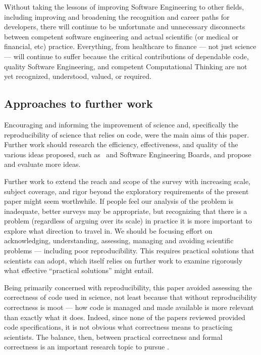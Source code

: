 \documentclass{comjnl}
\begin{document}
Without taking the lessons of improving Software Engineering to other fields, including improving and broadening the recognition and career paths for developers, there will continue to be unfortunate and unnecessary disconnects between competent software engineering and actual scientific (or medical or financial, etc) practice. Everything, from healthcare to finance --- not just science --- will continue to suffer because the critical contributions of dependable code, quality Software Engineering, and competent Computational Thinking are not yet recognized, understood, valued, or required. 

\subsection{Approaches to further work}
Encouraging and informing the improvement of science and, specifically the reproducibility of science that relies on code, were the main aims of this paper. Further work should research the efficiency, effectiveness, and quality of the various ideas proposed, such as \RAPstar\ and Software Engineering Boards, and propose and evaluate more ideas.

Further work to extend the reach and scope of the survey with increasing scale, subject coverage, and rigor beyond the exploratory requirements of the present paper might seem worthwhile. If people feel our analysis of the problem is inadequate, better surveys may be appropriate, but recognizing that there is a problem (regardless of arguing over its scale) in practice it is more important to explore what direction to travel in. We should be focusing effort on acknowledging, understanding, assessing, managing and avoiding scientific problems --- including poor reproducibility. This requires practical solutions that scientists can adopt, which itself relies on further work to examine rigorously what effective ``practical solutions'' might entail.

Being primarily concerned with reproducibility, this paper avoided assessing the correctness of code used in science, not least because that without reproducibility correctness is moot --- how code is managed and made available is more relevant than exactly what it does. Indeed, since none of the papers reviewed provided code specifications, it is not obvious what correctness means to practicing scientists. The balance, then, between practical correctness and formal correctness is an important research topic to pursue \cite{hoare-unreasonable}.
\end{document}
